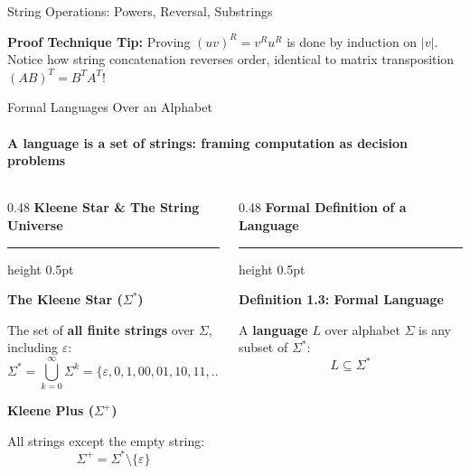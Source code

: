 \documentclass[aspectratio=169, 10pt]{beamer}
\newcommand{\colheader}[1]{%
  {\noindent\footnotesize\bfseries\color{gimpanavy}#1}%
  \vspace{0.02cm}%
  {\color{gimpanavy!30}\hrule height 0.5pt}%
  \vspace{0.05cm}%
}
\newcommand{\cardtitle}[1]{{\noindent\footnotesize\bfseries\color{gimpanavy}#1}\par\vspace{0.03cm}}
\newcommand{\greentitle}[1]{{\noindent\footnotesize\bfseries\color{accentGreen}#1}\par\vspace{0.03cm}}
\begin{document}
\begin{frame}{String Operations: Powers, Reversal, Substrings}
  \vspace{0.10cm}
  \begin{tcolorbox}[alertcard]
    {\scriptsize\textbf{Proof Technique Tip:} Proving $(uv)^R = v^R u^R$ is done by induction on $|v|$. Notice how string concatenation reverses order, identical to matrix transposition $(AB)^T = B^T A^T$!}
  \end{tcolorbox}
\end{frame}

\begin{frame}{Formal Languages Over an Alphabet}
  \framesubtitle{A language is a set of strings: framing computation as decision problems}
  
  \begin{columns}[T]
    \begin{column}{0.48\textwidth}
      \colheader{Kleene Star \& The String Universe}
      \begin{tcolorbox}[conceptcard]
        \cardtitle{The Kleene Star ($\Sigma^*$)}
        {\scriptsize
        The set of \textbf{all finite strings} over $\Sigma$, including $\varepsilon$:
        \[ \Sigma^* = \bigcup_{k=0}^{\infty} \Sigma^k = \{\varepsilon, 0, 1, 00, 01, 10, 11, \dots\} \]
        }
        \vspace{0.03cm}
        
        \cardtitle{Kleene Plus ($\Sigma^+$)}
        {\scriptsize
        All strings except the empty string:
        \[ \Sigma^+ = \Sigma^* \setminus \{\varepsilon\} \]
        }
      \end{tcolorbox}
    \end{column}
    
    \begin{column}{0.48\textwidth}
      \colheader{Formal Definition of a Language}
      \begin{tcolorbox}[examplecard]
        \greentitle{Definition 1.3: Formal Language}
        {\scriptsize
        A \textbf{language} $L$ over alphabet $\Sigma$ is any subset of $\Sigma^*$:
        \[ L \subseteq \Sigma^* \]
        }
        \vspace{0.03cm}
        

\end{tcolorbox}
\end{column}
\end{columns}
\end{frame}
\end{document}
